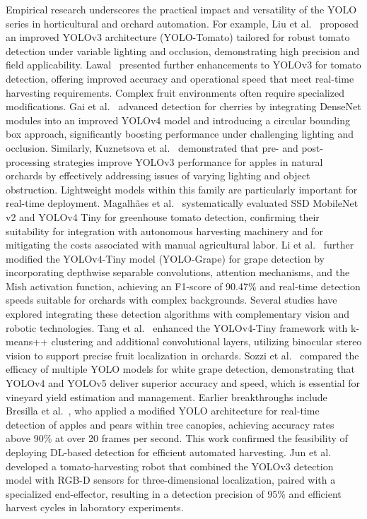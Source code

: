 \documentclass[a4paper,fleqn]{cas-dc}
\begin{document}
Empirical research underscores the practical impact and versatility of the YOLO series in horticultural and orchard automation. For example, Liu et al.~\cite{liu2020yolo} proposed an improved YOLOv3 architecture (YOLO-Tomato) tailored for robust tomato detection under variable lighting and occlusion, demonstrating high precision and field applicability. Lawal~\cite{lawal2021tomato} presented further enhancements to YOLOv3 for tomato detection, offering improved accuracy and operational speed that meet real-time harvesting requirements.
Complex fruit environments often require specialized modifications. Gai et al.~\cite{gai2023detection} advanced detection for cherries by integrating DenseNet modules into an improved YOLOv4 model and introducing a circular bounding box approach, significantly boosting performance under challenging lighting and occlusion. Similarly, Kuznetsova et al.~\cite{kuznetsova2020using} demonstrated that pre- and post-processing strategies improve YOLOv3 performance for apples in natural orchards by effectively addressing issues of varying lighting and object obstruction.
Lightweight models within this family are particularly important for real-time deployment. Magalhães et al.~\cite{magalhaes2021evaluating} systematically evaluated SSD MobileNet v2 and YOLOv4 Tiny for greenhouse tomato detection, confirming their suitability for integration with autonomous harvesting machinery and for mitigating the costs associated with manual agricultural labor. Li et al.~\cite{li2021real} further modified the YOLOv4-Tiny model (YOLO-Grape) for grape detection by incorporating depthwise separable convolutions, attention mechanisms, and the Mish activation function, achieving an F1-score of 90.47\% and real-time detection speeds suitable for orchards with complex backgrounds.
Several studies have explored integrating these detection algorithms with complementary vision and robotic technologies. Tang et al.~\cite{tang2023fruit} enhanced the YOLOv4-Tiny framework with k-means++ clustering and additional convolutional layers, utilizing binocular stereo vision to support precise fruit localization in orchards. Sozzi et al.~\cite{sozzi2022automatic} compared the efficacy of multiple YOLO models for white grape detection, demonstrating that YOLOv4 and YOLOv5 deliver superior accuracy and speed, which is essential for vineyard yield estimation and management.
Earlier breakthroughs include Bresilla et al.~\cite{bresilla2019single}, who applied a modified YOLO architecture for real-time detection of apples and pears within tree canopies, achieving accuracy rates above 90\% at over 20 frames per second. This work confirmed the feasibility of deploying DL-based detection for efficient automated harvesting. Jun et al.~\cite{jun2021towards} developed a tomato-harvesting robot that combined the YOLOv3 detection model with RGB-D sensors for three-dimensional localization, paired with a specialized end-effector, resulting in a detection precision of 95\% and efficient harvest cycles in laboratory experiments.
\end{document}
